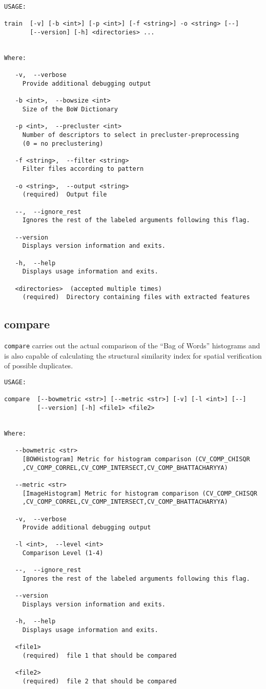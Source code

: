 \documentclass{hitec}
\begin{document}
\begin{verbatim}
USAGE: 

train  [-v] [-b <int>] [-p <int>] [-f <string>] -o <string> [--]
       [--version] [-h] <directories> ...


Where: 

   -v,  --verbose
     Provide additional debugging output

   -b <int>,  --bowsize <int>
     Size of the BoW Dictionary

   -p <int>,  --precluster <int>
     Number of descriptors to select in precluster-preprocessing 
	 (0 = no preclustering)

   -f <string>,  --filter <string>
     Filter files according to pattern

   -o <string>,  --output <string>
     (required)  Output file

   --,  --ignore_rest
     Ignores the rest of the labeled arguments following this flag.

   --version
     Displays version information and exits.

   -h,  --help
     Displays usage information and exits.

   <directories>  (accepted multiple times)
     (required)  Directory containing files with extracted features
\end{verbatim}

\subsection{compare}

\texttt{compare} carries out the actual comparison of the ``Bag of Words''
histograms and is also capable of calculating the structural similarity index
for spatial verification of possible duplicates.

\begin{verbatim}
USAGE: 

compare  [--bowmetric <str>] [--metric <str>] [-v] [-l <int>] [--]
         [--version] [-h] <file1> <file2>


Where: 

   --bowmetric <str>
     [BOWHistogram] Metric for histogram comparison (CV_COMP_CHISQR
     ,CV_COMP_CORREL,CV_COMP_INTERSECT,CV_COMP_BHATTACHARYYA)

   --metric <str>
     [ImageHistogram] Metric for histogram comparison (CV_COMP_CHISQR
     ,CV_COMP_CORREL,CV_COMP_INTERSECT,CV_COMP_BHATTACHARYYA)

   -v,  --verbose
     Provide additional debugging output

   -l <int>,  --level <int>
     Comparison Level (1-4)

   --,  --ignore_rest
     Ignores the rest of the labeled arguments following this flag.

   --version
     Displays version information and exits.

   -h,  --help
     Displays usage information and exits.

   <file1>
     (required)  file 1 that should be compared

   <file2>
     (required)  file 2 that should be compared
\end{verbatim}
\end{document}
